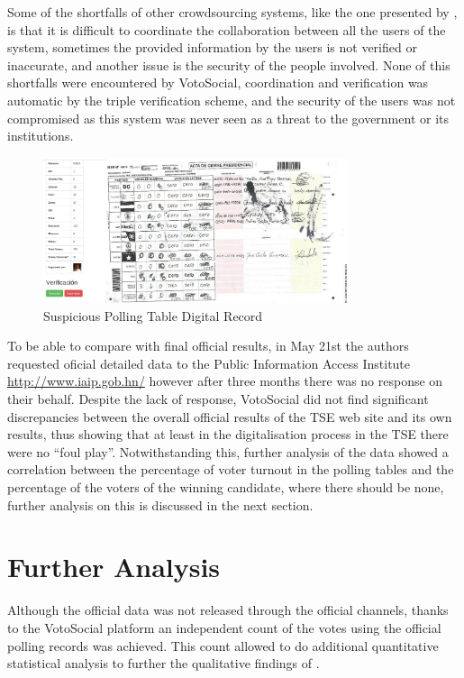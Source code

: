 \documentclass[letterpaper,10pt]{article}
\begin{document}
Some of the shortfalls of other crowdsourcing systems, like the one presented by \cite{gao2011}, is that it is difficult to coordinate the collaboration between all the users of the system, sometimes the provided information by the users is not verified or inaccurate, and another issue is the security of the people involved. None of this shortfalls were encountered by VotoSocial, coordination and verification was automatic by the triple verification scheme, and the security of the users was not compromised as this system was never seen as a threat to the government or its institutions.

\begin{figure}[h!]
    \centering
    \includegraphics[width=0.8\textwidth]{images/vs-valid-strange}
    \caption{Suspicious Polling Table Digital Record}
    \label{fig:strange}
\end{figure}

To be able to compare with final official results, in May 21st the authors requested oficial detailed data to the Public Information Access Institute \url{http://www.iaip.gob.hn/} however after three months there was no response on their behalf. Despite the lack of response, VotoSocial did not find significant discrepancies between the overall official results of the TSE web site and its own results, thus showing that at least in the digitalisation process in the TSE there were no ``foul play''. Notwithstanding this, further analysis of the data showed a correlation between the percentage of voter turnout in the polling tables and the percentage of the voters of the winning candidate, where there should be none, further analysis on this is discussed in the next section.




\section{Further Analysis}

Although the official data was not released through the official channels, thanks to the VotoSocial platform an independent count of the votes using the official polling records was achieved. This count allowed to do additional quantitative statistical analysis to further the qualitative findings of \cite{gonza2014}.
\end{document}

